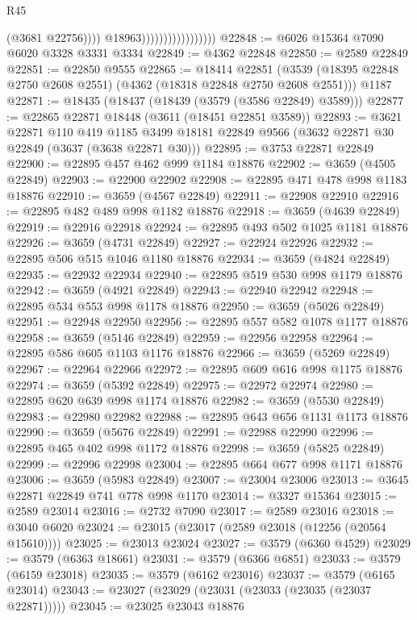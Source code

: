 \begin{lexlean}{R45}
\begin{coremodule}
                                            (@3681 @22756))))
                                      @18963)))))))))))))))))
@22848 := @6026 @15364 @7090 @6020 @3328 @3331 @3334
@22849 := @4362 @22848
@22850 := @2589 @22849
@22851 := @22850 @9555
@22865 := @18414
    @22851
    (@3539 (@18395 @22848 @2750 @2608 @2551) (@4362 (@18318 @22848 @2750 @2608 @2551)))
    @1187
@22871 := @18435 (@18437 (@18439 (@3579 (@3586 @22849) @3589)))
@22877 := @22865 @22871 @18448 (@3611 (@18451 @22851 @3589))
@22893 := @3621
    @22871
    @110
    @419
    @1185
    @3499
    @18181
    @22849
    @9566
    (@3632 @22871 @30 @22849 (@3637 (@3638 @22871 @30)))
@22895 := @3753 @22871 @22849
@22900 := @22895 @457 @462 @999 @1184 @18876
@22902 := @3659 (@4505 @22849)
@22903 := @22900 @22902
@22908 := @22895 @471 @478 @998 @1183 @18876
@22910 := @3659 (@4567 @22849)
@22911 := @22908 @22910
@22916 := @22895 @482 @489 @998 @1182 @18876
@22918 := @3659 (@4639 @22849)
@22919 := @22916 @22918
@22924 := @22895 @493 @502 @1025 @1181 @18876
@22926 := @3659 (@4731 @22849)
@22927 := @22924 @22926
@22932 := @22895 @506 @515 @1046 @1180 @18876
@22934 := @3659 (@4824 @22849)
@22935 := @22932 @22934
@22940 := @22895 @519 @530 @998 @1179 @18876
@22942 := @3659 (@4921 @22849)
@22943 := @22940 @22942
@22948 := @22895 @534 @553 @998 @1178 @18876
@22950 := @3659 (@5026 @22849)
@22951 := @22948 @22950
@22956 := @22895 @557 @582 @1078 @1177 @18876
@22958 := @3659 (@5146 @22849)
@22959 := @22956 @22958
@22964 := @22895 @586 @605 @1103 @1176 @18876
@22966 := @3659 (@5269 @22849)
@22967 := @22964 @22966
@22972 := @22895 @609 @616 @998 @1175 @18876
@22974 := @3659 (@5392 @22849)
@22975 := @22972 @22974
@22980 := @22895 @620 @639 @998 @1174 @18876
@22982 := @3659 (@5530 @22849)
@22983 := @22980 @22982
@22988 := @22895 @643 @656 @1131 @1173 @18876
@22990 := @3659 (@5676 @22849)
@22991 := @22988 @22990
@22996 := @22895 @465 @402 @998 @1172 @18876
@22998 := @3659 (@5825 @22849)
@22999 := @22996 @22998
@23004 := @22895 @664 @677 @998 @1171 @18876
@23006 := @3659 (@5983 @22849)
@23007 := @23004 @23006
@23013 := @3645 @22871 @22849 @741 @778 @998 @1170
@23014 := @3327 @15364
@23015 := @2589 @23014
@23016 := @2732 @7090
@23017 := @2589 @23016
@23018 := @3040 @6020
@23024 := @23015 (@23017 (@2589 @23018 (@12256 (@20564 @15610))))
@23025 := @23013 @23024
@23027 := @3579 (@6360 @4529)
@23029 := @3579 (@6363 @18661)
@23031 := @3579 (@6366 @6851)
@23033 := @3579 (@6159 @23018)
@23035 := @3579 (@6162 @23016)
@23037 := @3579 (@6165 @23014)
@23043 := @23027 (@23029 (@23031 (@23033 (@23035 (@23037 @22871)))))
@23045 := @23025 @23043 @18876

\end{coremodule}
\end{lexlean}
